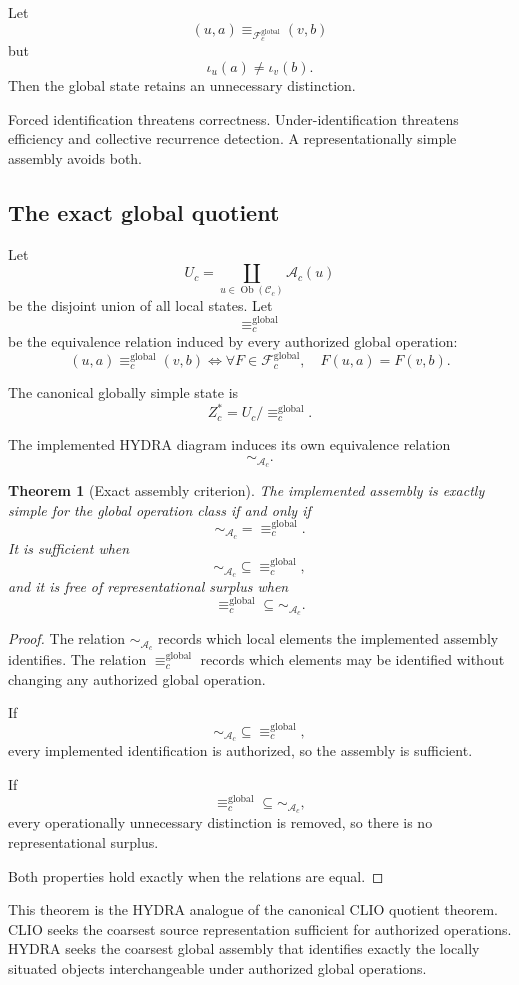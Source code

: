 \documentclass[11pt]{article}
\newtheorem{theorem}[definition]{Theorem}
\theoremstyle{definition}
\DeclareMathOperator{\Ob}{Ob}
\newcommand{\F}{\mathcal{F}}
\newcommand{\C}{\mathcal{C}}
\newcommand{\A}{\mathcal{A}}
\begin{document}
Let
\[
(u,a)\equiv_{\F_c^{\mathrm{global}}}(v,b)
\]
but
\[
\iota_u(a)\neq\iota_v(b).
\]
Then the global state retains an unnecessary distinction.

Forced identification threatens correctness. Under-identification threatens efficiency and collective recurrence detection. A representationally simple assembly avoids both.

\subsection{The exact global quotient}

Let
\[
U_c
=
\coprod_{u\in\Ob(\C_c)}
\A_c(u)
\]
be the disjoint union of all local states. Let
\[
\equiv_c^{\mathrm{global}}
\]
be the equivalence relation induced by every authorized global operation:
\[
(u,a)\equiv_c^{\mathrm{global}}(v,b)
\iff
\forall F\in\F_c^{\mathrm{global}},
\quad
F(u,a)=F(v,b).
\]

The canonical globally simple state is
\[
Z_c^{*}
=
U_c/{\equiv_c^{\mathrm{global}}}.
\]

The implemented HYDRA diagram induces its own equivalence relation
\[
\sim_{\A_c}.
\]

\begin{theorem}[Exact assembly criterion]
The implemented assembly is exactly simple for the global operation class if and only if
\[
\sim_{\A_c}
=
\equiv_c^{\mathrm{global}}.
\]
It is sufficient when
\[
\sim_{\A_c}
\subseteq
\equiv_c^{\mathrm{global}},
\]
and it is free of representational surplus when
\[
\equiv_c^{\mathrm{global}}
\subseteq
\sim_{\A_c}.
\]
\end{theorem}

\begin{proof}
The relation \(\sim_{\A_c}\) records which local elements the implemented assembly identifies. The relation \(\equiv_c^{\mathrm{global}}\) records which elements may be identified without changing any authorized global operation.

If
\[
\sim_{\A_c}
\subseteq
\equiv_c^{\mathrm{global}},
\]
every implemented identification is authorized, so the assembly is sufficient.

If
\[
\equiv_c^{\mathrm{global}}
\subseteq
\sim_{\A_c},
\]
every operationally unnecessary distinction is removed, so there is no representational surplus.

Both properties hold exactly when the relations are equal.
\end{proof}

This theorem is the HYDRA analogue of the canonical CLIO quotient theorem. CLIO seeks the coarsest source representation sufficient for authorized operations. HYDRA seeks the coarsest global assembly that identifies exactly the locally situated objects interchangeable under authorized global operations.
\end{document}
